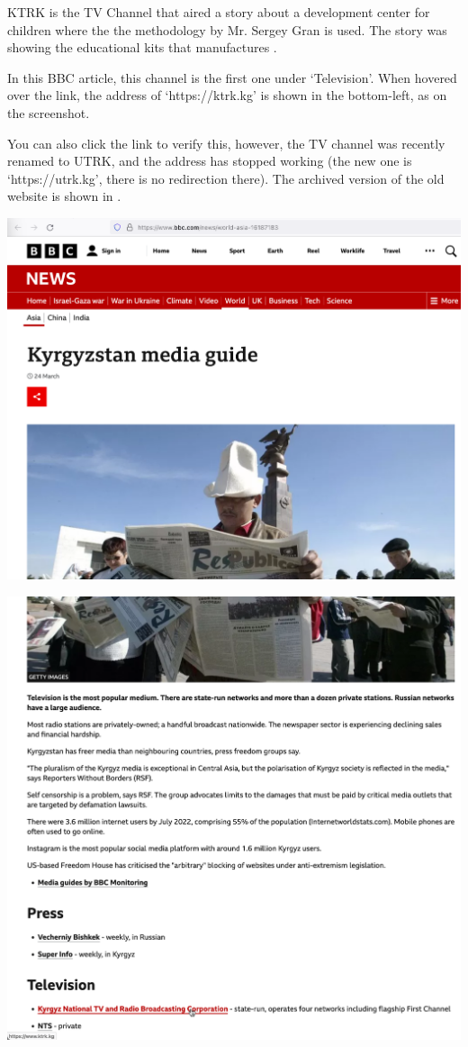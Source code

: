 
KTRK is the TV Channel that aired a story about a development center for children
where the the methodology by Mr. Sergey Gran is used.
The story was showing the educational kits that \GSchool manufactures .

In this BBC article, this channel is the first one under `Television'.
When hovered over the link, the address of `https://ktrk.kg' is shown in the bottom-left,
as on the screenshot.

You can also click the link to verify this, however, the TV channel was recently renamed
to UTRK, and the address has stopped working
(the new one is `https://utrk.kg', there is no redirection there).
The archived version of the old website is shown in .

\begin{center}
    \includegraphics[width=40em]{bbc-utrk-p1}
\end{center}
\WillContinue
\pagebreak

\Continuing
\begin{center}
    \includegraphics[width=40em]{bbc-utrk-p2}
\end{center}

\pagebreak
